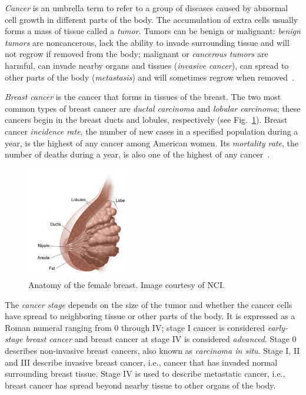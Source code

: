 \emph{Cancer} is an umbrella term to refer to a group of diseases caused by abnormal cell growth in different parts of the body. The accumulation of extra cells usually forms a mass of tissue called a \emph{tumor}. Tumors can be benign or malignant: \emph{benign tumors} are noncancerous, lack the ability to invade surrounding tissue and will not regrow if removed from the body;  malignant or \emph{cancerous tumors} are harmful, can invade nearby organs and tissues (\emph{invasive cancer}), can spread to other parts of the body (\emph{metastasis}) and will sometimes regrow when removed~\cite{WYNTKABreastCancer2012}.

\emph{Breast cancer} is the cancer that forms in tissues of the breast. The two most common types of breast cancer are \emph{ductal carcinoma} and \emph{lobular carcinoma}; these cancers begin in the breast ducts and lobules, respectively (see Fig.~\ref{fig:BreastAnatomy}). Breast cancer \emph{incidence rate}, the number of new cases in a specified population during a year, is the highest of any cancer among American women. Its \emph{mortality rate}, the number of deaths during a year, is also one of the highest of any cancer~\cite{Howlader2014}.

\begin{figure}[h]
	\centering
	\includegraphics[width = 0.4\textwidth]{plots/breastAnatomy.png}
	\caption[Female Breast Anatomy]{Anatomy of the female breast. Image courtesy of NCI.}
	\label{fig:BreastAnatomy}
\end{figure}

The \emph{cancer stage} depends on the size of the tumor and whether the cancer cells have spread to neighboring tissue or other parts of the body. It is expressed as a Roman numeral ranging from 0 through IV; stage I cancer is considered \emph{early-stage breast cancer} and breast cancer at stage IV is considered \emph{advanced}. Stage 0 describes non-invasive breast cancers, also known as \emph{carcinoma in situ}. Stage I, II and III describe invasive breast cancer, i.e., cancer that has invaded normal surrounding breast tissue. Stage IV is used to describe metastatic cancer, i.e., breast cancer has spread beyond nearby tissue to other organs of the body.
